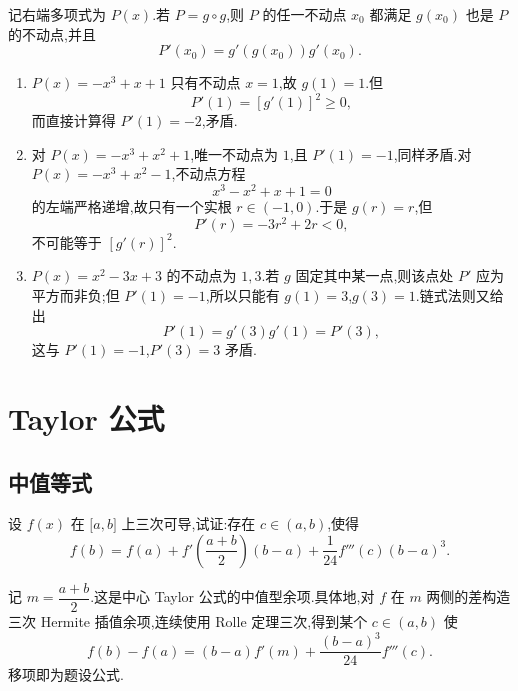 \begin{solution}
    记右端多项式为 $P(x)$.若 $P=g\circ g$,则 $P$ 的任一不动点 $x_0$ 都满足 $g(x_0)$ 也是 $P$ 的不动点,并且
    \[
        P'(x_0)=g'(g(x_0))g'(x_0).
    \]

    \begin{enumerate}
        \item $P(x)=-x^3+x+1$ 只有不动点 $x=1$,故 $g(1)=1$.但
              \[
                  P'(1)=[g'(1)]^2\geq0,
              \]
              而直接计算得 $P'(1)=-2$,矛盾.

        \item 对 $P(x)=-x^3+x^2+1$,唯一不动点为 $1$,且 $P'(1)=-1$,同样矛盾.对 $P(x)=-x^3+x^2-1$,不动点方程
              \[
                  x^3-x^2+x+1=0
              \]
              的左端严格递增,故只有一个实根 $r\in(-1,0)$.于是 $g(r)=r$,但
              \[
                  P'(r)=-3r^2+2r<0,
              \]
              不可能等于 $[g'(r)]^2$.

        \item $P(x)=x^2-3x+3$ 的不动点为 $1,3$.若 $g$ 固定其中某一点,则该点处 $P'$ 应为平方而非负;但 $P'(1)=-1$,所以只能有 $g(1)=3$,$g(3)=1$.链式法则又给出
              \[
                  P'(1)=g'(3)g'(1)=P'(3),
              \]
              这与 $P'(1)=-1$,$P'(3)=3$ 矛盾.
    \end{enumerate}
\end{solution}


\newpage

\section{Taylor 公式}


\subsection{中值等式}

\begin{example}
    设 $f(x)$ 在 $\lbrack a,b\rbrack$ 上三次可导,试证:存在 $c\in(a,b)$,使得
    \[
        f(b)=f(a)+f'\left(\dfrac{a+b}{2}\right)(b-a)
        +\dfrac{1}{24}f'''(c)(b-a)^3.
    \]
\end{example}
\exampleblank

\begin{solution}
    记 $m=\dfrac{a+b}{2}$.这是中心 Taylor 公式的中值型余项.具体地,对 $f$ 在 $m$ 两侧的差构造三次 Hermite 插值余项,连续使用 Rolle 定理三次,得到某个 $c\in(a,b)$ 使
    \[
        f(b)-f(a)
        =(b-a)f'(m)+\dfrac{(b-a)^3}{24}f'''(c).
    \]
    移项即为题设公式.
\end{solution}

